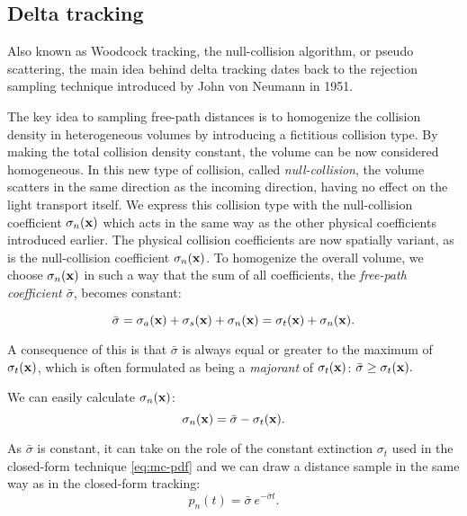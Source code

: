 \subsection{Delta tracking}\label{section:delta}
Also known as Woodcock tracking, the null-collision algorithm, or pseudo scattering, the main idea behind delta tracking dates back to the rejection sampling technique introduced by John von Neumann in 1951\cite{vonNeumann1951}.

The key idea to sampling free-path distances is to homogenize the collision density in heterogeneous volumes by introducing a fictitious collision type. By making the total collision density constant, the volume can be now considered homogeneous. In this new type of collision, called \textit{null-collision}, the volume scatters in the same direction as the incoming direction, having no effect on the light transport itself. We express this collision type with the null-collision coefficient $\sigma_n(\textbf{x})$ which acts in the same way as the other physical coefficients introduced earlier. The physical collision coefficients are now spatially variant, as is the null-collision coefficient $\sigma_n(\textbf{x})$. To homogenize the overall volume, we choose $\sigma_n(\textbf{x})$ in such a way that the sum of all coefficients, the \textit{free-path coefficient $\bar{\sigma}$}, becomes constant:

\begin{equation}
\bar{\sigma} = \sigma_a(\textbf{x}) + \sigma_s(\textbf{x}) + \sigma_n(\textbf{x}) = \sigma_t(\textbf{x}) + \sigma_n(\textbf{x}).    
\end{equation}

\noindent A consequence of this is that $\bar\sigma$ is always equal or greater to the maximum of $\sigma_t(\textbf{x})$, which is often formulated as being a \textit{majorant} of $\sigma_t(\textbf{x})$:
$
    \bar{\sigma} \geq \sigma_t(\textbf{x}).
$

\noindent We can easily calculate $\sigma_n(\textbf{x})$:
\begin{equation}
    \sigma_n(\textbf{x}) = \bar\sigma - \sigma_t(\textbf{x}).
\end{equation}

\noindent As $\bar\sigma$ is constant, it can take on the role of the constant extinction $\sigma_t$ used in the closed-form technique \ref{eq:mc-pdf} and we can draw a distance sample in the same way as in the closed-form tracking:
\begin{equation}\label{eq:mc-pn}
    p_n(t) = \bar{\sigma}~e^{-\bar\sigma t}.
\end{equation}

